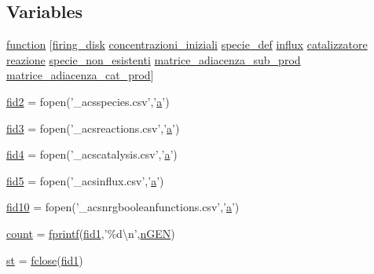 \subsection*{Variables}
\begin{DoxyCompactItemize}
\item 
\hyperlink{a00062_a4b4c670b101bf7a838f775e008fa6255}{function} \mbox{[}\hyperlink{a00055_acb72987b5000cf59c6f81c482e2ac8ac}{firing\-\_\-disk} \hyperlink{a00055_a89801fa89eee3ba40f6610f290d6f6c3}{concentrazioni\-\_\-iniziali} \hyperlink{a00062_a85d979dc881d9a49537b0f43daa2b360}{specie\-\_\-def} \hyperlink{a00059_a902e747aeec6b345d3a057099152f41f}{influx} \hyperlink{a00054_a14959eaa108dcffcec704a207775f7e8}{catalizzatore} \hyperlink{a00062_a65cf6e12ba9a8c10222f3f1f71f7c95f}{reazione} \hyperlink{a00062_adfcfd2749a68fa87ece8ec3caa194b3d}{specie\-\_\-non\-\_\-esistenti} \hyperlink{a00056_a3568a7566d3871de5460f8fe96044c26}{matrice\-\_\-adiacenza\-\_\-sub\-\_\-prod} \hyperlink{a00056_a23c87a364bec91d4eb554b9eabe0b767}{matrice\-\_\-adiacenza\-\_\-cat\-\_\-prod}\mbox{]}
\item 
\hyperlink{a00062_a11af2c31c7926441f43875d99b4577d2}{fid2} = fopen('\-\_\-acsspecies.\-csv','\hyperlink{a00029_a2ffdbad9ea59541e59cbd2b938e0770c}{a}')
\item 
\hyperlink{a00062_a153e3250d4161f9bea4c140498016d94}{fid3} = fopen('\-\_\-acsreactions.\-csv','\hyperlink{a00029_a2ffdbad9ea59541e59cbd2b938e0770c}{a}')
\item 
\hyperlink{a00062_a28f0b3b80ef3c84a4a00660a307d2147}{fid4} = fopen('\-\_\-acscatalysis.\-csv','\hyperlink{a00029_a2ffdbad9ea59541e59cbd2b938e0770c}{a}')
\item 
\hyperlink{a00062_af5f7ad66ed343bca8289a4d44dbff04f}{fid5} = fopen('\-\_\-acsinflux.\-csv','\hyperlink{a00029_a2ffdbad9ea59541e59cbd2b938e0770c}{a}')
\item 
\hyperlink{a00062_aadad4fd2d661ea2b9f0c3a95e3f7b4ba}{fid10} = fopen('\-\_\-acsnrgbooleanfunctions.\-csv','\hyperlink{a00029_a2ffdbad9ea59541e59cbd2b938e0770c}{a}')
\item 
\hyperlink{a00062_aa0a4866d2600caeb20cfacee8eefc922}{count} = \hyperlink{a00062_aa6dc40efe43a338c9ff278260d95b4d9}{fprintf}(\hyperlink{a00022_ae941ef58ebac7f05a8095badde51c07b}{fid1},'\%d\textbackslash{}n',\hyperlink{a00065_a4c8fe523edbe179c5d215da13f469f72}{n\-G\-E\-N})
\item 
\hyperlink{a00062_afbed6b4ecdae7969c5b47d7d4e71495f}{st} = \hyperlink{a00027_a66a54a4db5a27a03991b5f3034bbc6a4}{fclose}(\hyperlink{a00022_ae941ef58ebac7f05a8095badde51c07b}{fid1})

\end{DoxyCompactItemize}

